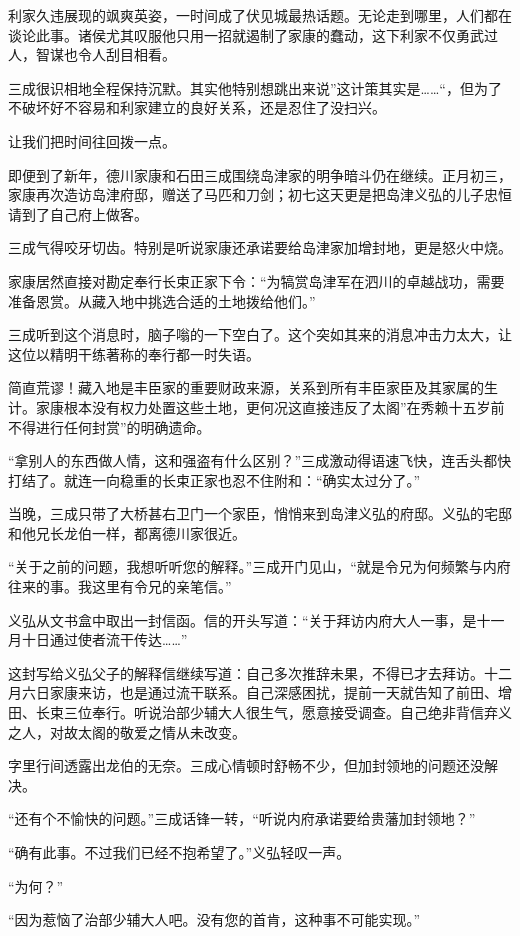 \documentclass[
]{article}
\begin{document}
利家久违展现的飒爽英姿，一时间成了伏见城最热话题。无论走到哪里，人们都在谈论此事。诸侯尤其叹服他只用一招就遏制了家康的蠢动，这下利家不仅勇武过人，智谋也令人刮目相看。

三成很识相地全程保持沉默。其实他特别想跳出来说''这计策其实是\ldots\ldots``，但为了不破坏好不容易和利家建立的良好关系，还是忍住了没扫兴。

让我们把时间往回拨一点。

即便到了新年，德川家康和石田三成围绕岛津家的明争暗斗仍在继续。正月初三，家康再次造访岛津府邸，赠送了马匹和刀剑；初七这天更是把岛津义弘的儿子忠恒请到了自己府上做客。

三成气得咬牙切齿。特别是听说家康还承诺要给岛津家加增封地，更是怒火中烧。

家康居然直接对勘定奉行长束正家下令：``为犒赏岛津军在泗川的卓越战功，需要准备恩赏。从藏入地中挑选合适的土地拨给他们。''

三成听到这个消息时，脑子嗡的一下空白了。这个突如其来的消息冲击力太大，让这位以精明干练著称的奉行都一时失语。

简直荒谬！藏入地是丰臣家的重要财政来源，关系到所有丰臣家臣及其家属的生计。家康根本没有权力处置这些土地，更何况这直接违反了太阁''在秀赖十五岁前不得进行任何封赏''的明确遗命。

``拿别人的东西做人情，这和强盗有什么区别？''三成激动得语速飞快，连舌头都快打结了。就连一向稳重的长束正家也忍不住附和：``确实太过分了。''

当晚，三成只带了大桥甚右卫门一个家臣，悄悄来到岛津义弘的府邸。义弘的宅邸和他兄长龙伯一样，都离德川家很近。

``关于之前的问题，我想听听您的解释。''三成开门见山，``就是令兄为何频繁与内府往来的事。我这里有令兄的亲笔信。''

义弘从文书盒中取出一封信函。信的开头写道：``关于拜访内府大人一事，是十一月十日通过使者流干传达\ldots\ldots{}''

这封写给义弘父子的解释信继续写道：自己多次推辞未果，不得已才去拜访。十二月六日家康来访，也是通过流干联系。自己深感困扰，提前一天就告知了前田、增田、长束三位奉行。听说治部少辅大人很生气，愿意接受调查。自己绝非背信弃义之人，对故太阁的敬爱之情从未改变。

字里行间透露出龙伯的无奈。三成心情顿时舒畅不少，但加封领地的问题还没解决。

``还有个不愉快的问题。''三成话锋一转，``听说内府承诺要给贵藩加封领地？''

``确有此事。不过我们已经不抱希望了。''义弘轻叹一声。

``为何？''

``因为惹恼了治部少辅大人吧。没有您的首肯，这种事不可能实现。''
\end{document}
